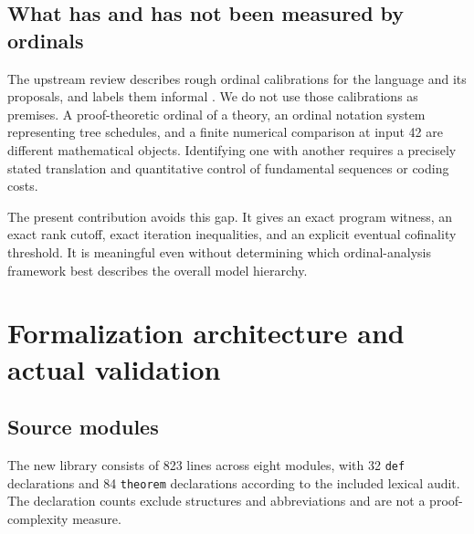 \documentclass[11pt,letterpaper]{article}
\theoremstyle{definition}
\newcommand{\code}[1]{\texttt{#1}}
\begin{document}
\subsection{What has and has not been measured by ordinals}

The upstream review describes rough ordinal calibrations for the language and
its proposals, and labels them informal \cite{repo-review}. We do not use
those calibrations as premises. A proof-theoretic ordinal of a theory, an
ordinal notation system representing tree schedules, and a finite numerical
comparison at input 42 are different mathematical objects. Identifying one
with another requires a precisely stated translation and quantitative control
of fundamental sequences or coding costs.

The present contribution avoids this gap. It gives an exact program witness,
an exact rank cutoff, exact iteration inequalities, and an explicit eventual
cofinality threshold. It is meaningful even without determining which
ordinal-analysis framework best describes the overall model hierarchy.

\section{Formalization architecture and actual validation}
\label{sec:validation}

\subsection{Source modules}

The new library consists of 823 lines across eight modules, with 32
\code{def} declarations and 84 \code{theorem} declarations according to the
included lexical audit. The declaration counts exclude structures and
abbreviations and are not a proof-complexity measure.
\end{document}
